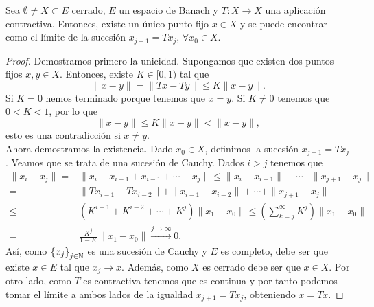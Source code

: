 \begin{theorem}
Sea $\displaystyle \emptyset \neq X \subset E$ cerrado, $\displaystyle E $ un espacio de Banach y $\displaystyle T : X \to X $ una aplicación contractiva. Entonces, existe un único punto fijo $\displaystyle x \in X $ y se puede encontrar como el límite de la sucesión $\displaystyle x_{j+1}=Tx_{j} $, $\displaystyle \forall x_{0} \in X $. 
\end{theorem}
\begin{proof}
Demostramos primero la unicidad. Supongamos que existen dos puntos fijos $\displaystyle x,y \in X $. Entonces, existe $\displaystyle K \in [0,1) $ tal que 
\[ \|x - y \| = \|Tx - Ty\| \leq K \|x-y\| .\]
Si $\displaystyle K = 0 $ hemos terminado porque tenemos que $\displaystyle x = y $. Si $\displaystyle K \neq 0 $ tenemos que $\displaystyle 0 < K < 1 $, por lo que
\[\|x-y\| \leq K\|x-y\| < \|x-y\| ,\]
esto es una contradicción si $\displaystyle x \neq y $. \\
Ahora demostramos la existencia. Dado $\displaystyle x_{0} \in X $, definimos la sucesión $\displaystyle x_{j+1}=Tx_{j} $. Veamos que se trata de una sucesión de Cauchy. Dados $\displaystyle i > j $ tenemos que 
\[
\begin{split}
	\|x_{i}-x_{j}\| = & \|x_{i}-x_{i-1} + x_{i-1} + \cdots -x_{j}\| \leq \|x_{i}-x_{i-1}\|+ \cdots + \|x_{j+1}-x_{j}\| \\
	= & \|Tx_{i-1}-Tx_{i-2}\| + \|x_{i-1}-x_{i-2}\| + \cdots + \|x_{j+1}-x_{j}\| \\
	\leq & \left(K^{i-1} + K^{i-2} + \cdots + K^{j}\right)\|x_{1}-x_{0}\| \leq \left(\sum^{\infty}_{k = j}K^{j}\right)\|x_{1}-x_{0}\| \\
	= & \frac{K^{j}}{1-K} \|x_{1}-x_{0}\| \xrightarrow{j \to \infty} 0.
\end{split}
\]
Así, como $\displaystyle \left\{ x_{j}\right\} _{j \in \mathbb{N}} $ es una sucesión de Cauchy y $\displaystyle E $ es completo, debe ser que existe $\displaystyle x \in E $ tal que $\displaystyle x_{j}\to x $. Además, como $\displaystyle X $ es cerrado debe ser que $\displaystyle x \in X $. Por otro lado, como $\displaystyle T $ es contractiva tenemos que es continua y por tanto podemos tomar el límite a ambos lados de la igualdad $\displaystyle x_{j+1} = Tx_{j} $, obteniendo $\displaystyle x = Tx $. 
\end{proof}

